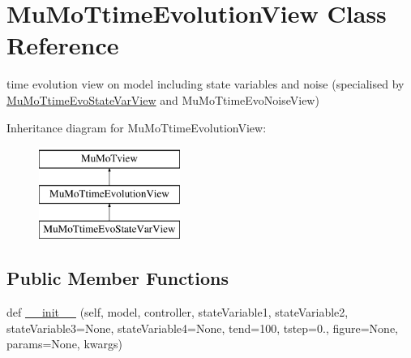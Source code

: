 \hypertarget{class_mu_mo_t_1_1_mu_mo_t_1_1_mu_mo_ttime_evolution_view}{}\section{Mu\+Mo\+Ttime\+Evolution\+View Class Reference}
\label{class_mu_mo_t_1_1_mu_mo_t_1_1_mu_mo_ttime_evolution_view}


time evolution view on model including state variables and noise (specialised by \hyperlink{class_mu_mo_t_1_1_mu_mo_t_1_1_mu_mo_ttime_evo_state_var_view}{Mu\+Mo\+Ttime\+Evo\+State\+Var\+View} and Mu\+Mo\+Ttime\+Evo\+Noise\+View)  


Inheritance diagram for Mu\+Mo\+Ttime\+Evolution\+View\+:\begin{figure}[H]
\begin{center}
\leavevmode
\includegraphics[height=3.000000cm]{class_mu_mo_t_1_1_mu_mo_t_1_1_mu_mo_ttime_evolution_view}
\end{center}
\end{figure}
\subsection*{Public Member Functions}
\begin{DoxyCompactItemize}
\item 
def \hyperlink{class_mu_mo_t_1_1_mu_mo_t_1_1_mu_mo_ttime_evolution_view_a5e770e35882c7ca31a269958f19a6850}{\+\_\+\+\_\+init\+\_\+\+\_\+} (self, model, controller, state\+Variable1, state\+Variable2, state\+Variable3=None, state\+Variable4=None, tend=100, tstep=0., figure=None, params=None, kwargs)
\end{DoxyCompactItemize}
